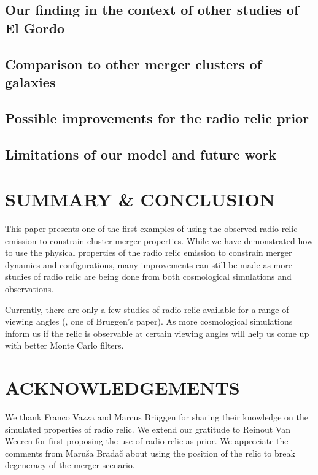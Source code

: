 \subsection{Our finding in the context of other studies of El Gordo}


\subsection{Comparison to other merger clusters of galaxies}


\subsection{Possible improvements for the radio relic prior}


\subsection{Limitations of our model and future work} 



\section{SUMMARY \& CONCLUSION}
This paper presents one of the first examples of using the observed radio
relic emission to constrain cluster merger properties.
While we have demonstrated how to use the physical properties of the radio
relic emission to constrain merger dynamics and configurations, many
improvements can still be made as more studies of radio relic are being
done from both cosmological simulations and observations.

Currently, there are only a few studies of
 radio relic available for a range of viewing angles (, one of
Bruggen's paper). As more cosmological simulations inform us  
if the relic is observable at certain viewing angles will help us 
come up with better Monte Carlo filters. 

\section{ACKNOWLEDGEMENTS}
We thank Franco Vazza and Marcus Br\"{u}ggen for sharing their knowledge on
the simulated properties of radio relic. We
extend our gratitude to Reinout Van Weeren for first proposing the use of
radio relic as prior. We appreciate the comments from Maru\v{s}a
Brada\v{c} about using the position of the relic to break degeneracy
of the merger scenario. 



